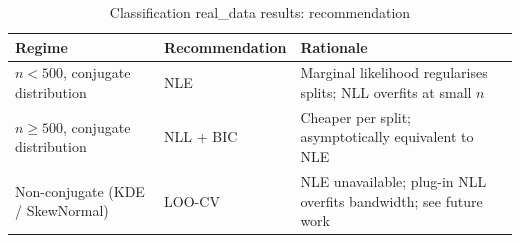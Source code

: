 \begin{table}
\caption{Classification real_data results: recommendation}
\label{tab:classification_real_data_recommendation}
\begin{tabular}{lll}
\toprule
Regime & Recommendation & Rationale \\
\midrule
$n < 500$, conjugate distribution & NLE & Marginal likelihood regularises splits; NLL overfits at small $n$ \\
$n \geq 500$, conjugate distribution & NLL + BIC & Cheaper per split; asymptotically equivalent to NLE \\
Non-conjugate (KDE / SkewNormal) & LOO-CV & NLE unavailable; plug-in NLL overfits bandwidth; see future work \\
\bottomrule
\end{tabular}
\end{table}
